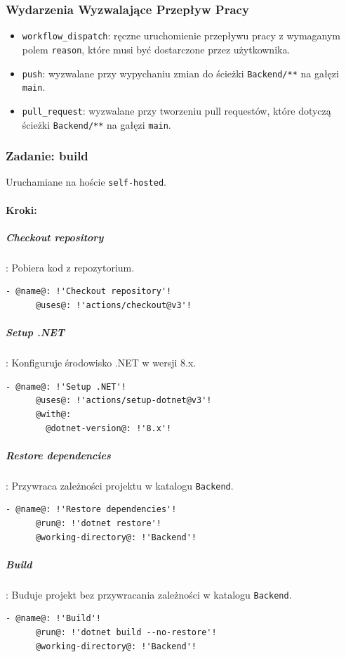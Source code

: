 \subsubsection{Wydarzenia Wyzwalające Przepływ Pracy}
\begin{itemize}
    \item \texttt{\textcolor{codeblue}{workflow\_dispatch}}: ręczne uruchomienie przepływu pracy z wymaganym polem \texttt{\textcolor{codeblue}{reason}}, które musi być dostarczone przez użytkownika.
    \item \texttt{\textcolor{codeblue}{push}}: wyzwalane przy wypychaniu zmian do ścieżki \texttt{\textcolor{codeblue}{Backend/**}} na gałęzi \texttt{\textcolor{codeblue}{main}}.
    \item \texttt{\textcolor{codeblue}{pull\_request}}: wyzwalane przy tworzeniu pull requestów, które dotyczą ścieżki \texttt{\textcolor{codeblue}{Backend/**}} na gałęzi \texttt{\textcolor{codeblue}{main}}.
\end{itemize}

\subsubsection{Zadanie: build}
Uruchamiane na hoście \texttt{\textcolor{codeblue}{self-hosted}}.
\paragraph{Kroki:}
\subparagraph{Checkout repository}: Pobiera kod z repozytorium.
\begin{lstlisting}[style=yaml-colored]
    - @name@: !'Checkout repository'!
      @uses@: !'actions/checkout@v3'!
\end{lstlisting}

\subparagraph{Setup .NET}: Konfiguruje środowisko .NET w wersji 8.x.
\begin{lstlisting}[style=yaml-colored]
    - @name@: !'Setup .NET'!
      @uses@: !'actions/setup-dotnet@v3'!
      @with@:
        @dotnet-version@: !'8.x'!
\end{lstlisting}

\subparagraph{Restore dependencies}: Przywraca zależności projektu w katalogu \texttt{\textcolor{codeblue}{Backend}}.
\begin{lstlisting}[style=yaml-colored]
    - @name@: !'Restore dependencies'!
      @run@: !'dotnet restore'!
      @working-directory@: !'Backend'!
\end{lstlisting}

\subparagraph{Build}: Buduje projekt bez przywracania zależności w katalogu \texttt{\textcolor{codeblue}{Backend}}.
\begin{lstlisting}[style=yaml-colored]
    - @name@: !'Build'!
      @run@: !'dotnet build --no-restore'!
      @working-directory@: !'Backend'!
\end{lstlisting}

